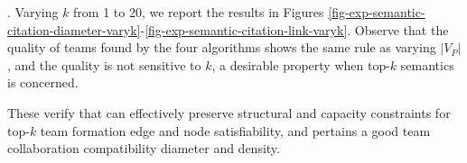 
. Varying $k$ from 1 to 20, we report the results in Figures
\ref{fig-exp-semantic-citation-diameter-varyk}-\ref{fig-exp-semantic-citation-link-varyk}.
Observe that the quality of teams found by the four algorithms shows the same rule as varying $|V_{P}|$, and the quality is not sensitive to $k$, a desirable property when top-$k$ semantics is concerned.

These verify that \optgrouprec can effectively preserve structural and capacity constraints for top-$k$ team formation \wrt edge and node satisfiability, and pertains a good team collaboration compatibility \wrt diameter and density.

